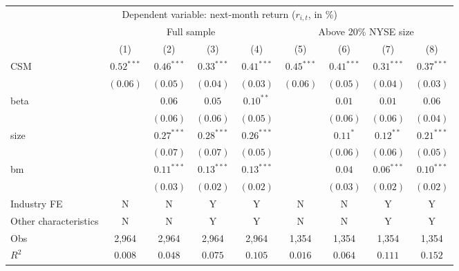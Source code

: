 \begin{tabular}{lcccccccc}
  \hline \multicolumn{9}{c}{Dependent variable: next-month return ($r_{i,t}$, in \%)} \\
 \cmidrule(l){2-9}  & \multicolumn{4}{c}{Full sample} & \multicolumn{4}{c}{Above 20\% NYSE size} \\
 \cmidrule(l){2-5} \cmidrule(l){6-9}  \vspace{5pt} & (1) & (2) & (3) & (4) & (5) & (6) & (7) & (8) \\ 
  CSM & $0.52^{***}$ & $0.46^{***}$ & $0.33^{***}$ & $0.41^{***}$ & $0.45^{***}$ & $0.41^{***}$ & $0.31^{***}$ & $0.37^{***}$ \\ 
   & $(0.06)$ & $(0.05)$ & $(0.04)$ & $(0.03)$ & $(0.06)$ & $(0.05)$ & $(0.04)$ & $(0.03)$ \\ 
  beta &  & $0.06$ & $0.05$ & $0.10^{**}$ &  & $0.01$ & $0.01$ & $0.06$ \\ 
   &  & $(0.06)$ & $(0.06)$ & $(0.05)$ &  & $(0.06)$ & $(0.06)$ & $(0.04)$ \\ 
  size &  & $0.27^{***}$ & $0.28^{***}$ & $0.26^{***}$ &  & $0.11^{*}$ & $0.12^{**}$ & $0.21^{***}$ \\ 
   &  & $(0.07)$ & $(0.07)$ & $(0.05)$ &  & $(0.06)$ & $(0.06)$ & $(0.05)$ \\ 
  bm &  & $0.11^{***}$ & $0.13^{***}$ & $0.13^{***}$ &  & $0.04$ & $0.06^{***}$ & $0.10^{***}$ \\ 
   \vspace{5pt} &  & $(0.03)$ & $(0.02)$ & $(0.02)$ &  & $(0.03)$ & $(0.02)$ & $(0.02)$ \\ 
  Industry FE & N & N & Y & Y & N & N & Y & Y \\ 
   \vspace{5pt}Other characteristics & N & N & Y & Y & N & N & Y & Y \\ 
  Obs & 2,964 & 2,964 & 2,964 & 2,964 & 1,354 & 1,354 & 1,354 & 1,354 \\ 
  $R^2$ & $0.008$ & $0.048$ & $0.075$ & $0.105$ & $0.016$ & $0.064$ & $0.111$ & $0.152$ \\ 
   \bottomrule\end{tabular}
